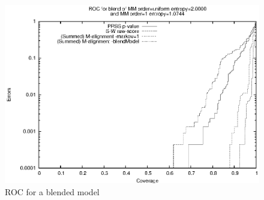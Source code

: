 \documentclass[letterpaper,11pt,oneside]{article}
\def\plotwidth{0.75\columnwidth}
\begin{document}
\begin{figure}[ht!]
\centering
\includegraphics{roc_blend}
\caption{\label{fig:roc_blend}ROC for a blended model}
\end{figure}

\end{document}
